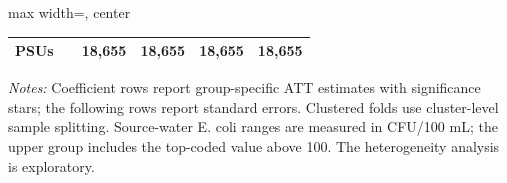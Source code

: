 \begin{landscape}
\begin{table}[p]
\begin{adjustbox}{max width=\linewidth, center}
\begin{tabular}{llcccc}
\quad PSUs &  & 18,655 & 18,655 & 18,655 & 18,655 \\
\bottomrule
\end{tabular}
\end{adjustbox}
\par\vspace{3pt}
\begin{minipage}{\linewidth}\footnotesize \textit{Notes:} Coefficient rows report group-specific ATT estimates with significance stars; the following rows report standard errors. Clustered folds use cluster-level sample splitting. Source-water E. coli ranges are measured in CFU/100 mL; the upper group includes the top-coded value above 100. The heterogeneity analysis is exploratory.\end{minipage}
\end{table}
\end{landscape}